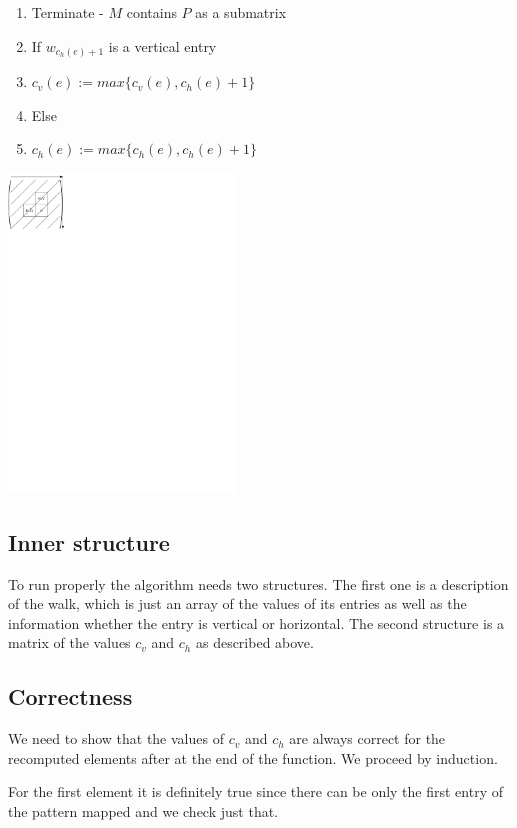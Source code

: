 \begin{enumerate}
\item \hspace{2cm} Terminate - $M$ contains $P$ as a submatrix
\item \hspace{15mm} If $w_{c_h(e)+1}$ is a vertical entry
\item \hspace{2cm} $c_v(e):=max\{c_v(e),c_h(e)+1\}$
\item \hspace{15mm} Else
\item \hspace{2cm} $c_h(e):=max\{c_h(e),c_h(e)+1\}$
\end{enumerate}

\centerline{\mbox{\includegraphics[width=60mm]{../img/walking_alg.pdf}}}

\subsection{Inner structure}
To run properly the algorithm needs two structures. The first one is a description of the walk, which is just an array of the values of its entries as well as the information whether the entry is vertical or horizontal. The second structure is a matrix of the values $c_v$ and $c_h$ as described above.

\subsection{Correctness}
We need to show that the values of $c_v$ and $c_h$ are always correct for the recomputed elements after at the end of the function. We proceed by induction.

For the first element it is definitely true since there can be only the first entry of the pattern mapped and we check just that.

